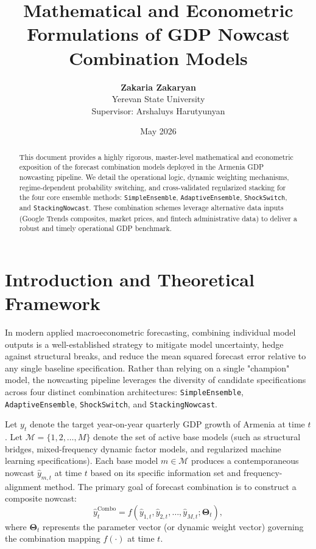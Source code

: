 \documentclass[12pt,a4paper]{article}
\title{\textbf{Mathematical and Econometric Formulations of GDP Nowcast Combination Models}}
\author{\textbf{Zakaria Zakaryan} \\ Yerevan State University \\ \small Supervisor: Arshaluys Harutyunyan}
\date{May 2026}
\begin{document}
\maketitle

\begin{abstract}
This document provides a highly rigorous, master-level mathematical and econometric exposition of the forecast combination models deployed in the Armenia GDP nowcasting pipeline. We detail the operational logic, dynamic weighting mechanisms, regime-dependent probability switching, and cross-validated regularized stacking for the four core ensemble methods: \texttt{SimpleEnsemble}, \texttt{AdaptiveEnsemble}, \texttt{ShockSwitch}, and \texttt{StackingNowcast}. These combination schemes leverage alternative data inputs (Google Trends composites, market prices, and fintech administrative data) to deliver a robust and timely operational GDP benchmark.
\end{abstract}

\section{Introduction and Theoretical Framework}

In modern applied macroeconometric forecasting, combining individual model outputs is a well-established strategy to mitigate model uncertainty, hedge against structural breaks, and reduce the mean squared forecast error relative to any single baseline specification. Rather than relying on a single "champion" model, the nowcasting pipeline leverages the diversity of candidate specifications across four distinct combination architectures: \texttt{SimpleEnsemble}, \texttt{AdaptiveEnsemble}, \texttt{ShockSwitch}, and \texttt{StackingNowcast}.

Let $y_t$ denote the target year-on-year quarterly GDP growth of Armenia at time $t$. Let $\mathcal{M} = \{1, 2, \dots, M\}$ denote the set of active base models (such as structural bridges, mixed-frequency dynamic factor models, and regularized machine learning specifications). Each base model $m \in \mathcal{M}$ produces a contemporaneous nowcast $\hat{y}_{m,t}$ at time $t$ based on its specific information set and frequency-alignment method. The primary goal of forecast combination is to construct a composite nowcast:
\begin{equation}
    \hat{y}_{t}^{\text{Combo}} = f\left(\hat{y}_{1,t}, \hat{y}_{2,t}, \dots, \hat{y}_{M,t}; \mathbf{\Theta}_t\right),
\end{equation}
where $\mathbf{\Theta}_t$ represents the parameter vector (or dynamic weight vector) governing the combination mapping $f(\cdot)$ at time $t$.
\end{document}
